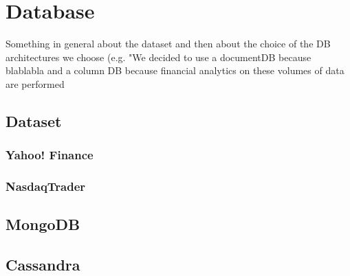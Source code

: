 \chapter{Database}

Something in general about the dataset and then about the choice of the DB architectures we choose (e.g. "We decided to use a documentDB because blablabla and a column DB because financial analytics on these volumes of data are performed 

\section{Dataset}

\subsection{Yahoo! Finance}

\subsection{NasdaqTrader}


\section{MongoDB}

\section{Cassandra}